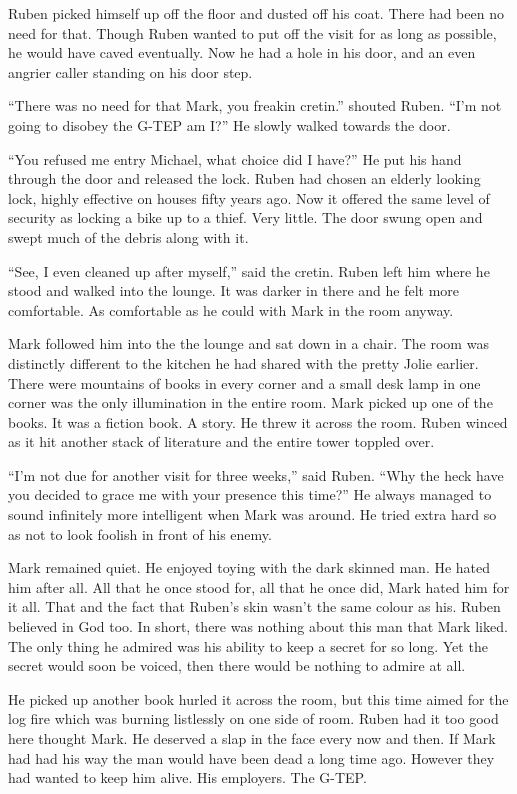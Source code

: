 Ruben picked himself up off the floor and dusted off his coat.  There had been no need for that.  Though Ruben wanted to put off the visit for as long as possible, he would have caved eventually.  Now he had a hole in his door, and an even angrier caller standing on his door step.

``There was no need for that Mark, you freakin cretin.'' shouted Ruben.  ``I'm not going to disobey the G-TEP am I?''  He slowly walked towards the door.

``You refused me entry Michael, what choice did I have?''  He put his hand through the door and released the lock.  Ruben had chosen an elderly looking lock, highly effective on houses fifty years ago. Now it offered the same level of security as locking a bike up to a thief.  Very little.  The door swung open and swept much of the debris along with it.  

``See, I even cleaned up after myself,'' said the cretin.  Ruben left him where he stood and walked into the lounge.  It was darker in there and he felt more comfortable.  As comfortable as he could with Mark in the room anyway.  

Mark followed him into the the lounge and sat down in a chair.  The room was distinctly different to the kitchen he had shared with the pretty Jolie earlier.  There were mountains of books in every corner and a small desk lamp in one corner was the only illumination in the entire room.  Mark picked up one of the books.  It was a fiction book.  A story.  He threw it across the room.  Ruben winced as it hit another stack of literature and the entire tower toppled over.  

``I'm not due for another visit for three weeks,'' said Ruben.  ``Why the heck have you decided to grace me with your presence this time?''  He always managed to sound infinitely more intelligent when Mark was around.  He tried extra hard so as not to look foolish in front of his enemy.

Mark remained quiet.  He enjoyed toying with the dark skinned man.  He hated him after all.  All that he once stood for, all that he once did, Mark hated him for it all.  That and the fact that Ruben's skin wasn't the same colour as his.  Ruben believed in God too.  In short, there was nothing about this man that Mark liked.  The only thing he admired was his ability to keep a secret for so long.  Yet the secret would soon be voiced, then there would be nothing to admire at all.

He picked up another book hurled it across the room, but this time aimed for the log fire which was burning listlessly on one side of room.  Ruben had it too good here thought Mark.  He deserved a slap in the face every now and then.  If Mark had had his way the man would have been dead a long time ago.  However they had wanted to keep him alive.  His employers.  The G-TEP.

